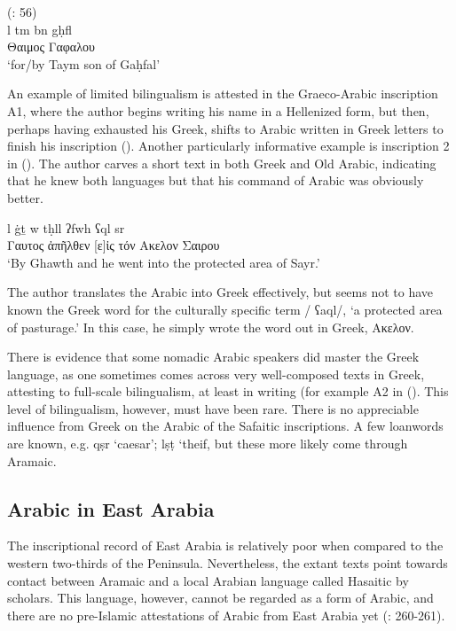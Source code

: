 \documentclass[output=paper]{langsci/langscibook}
\begin{document}
\ea (\citet{Al-Jallad & Al-Manaser 2016}: 56) \\
\gll   l tm bn gḥfl \\
      Θαιμος Γαφαλου \\
\glt   `for/by Taym son of Gaḥfal'\\
\z

An example of limited bilingualism is attested in the Graeco-Arabic inscription A1, where the author begins writing his name in a Hellenized form, but then, perhaps having exhausted his Greek, shifts to Arabic written in Greek letters to finish his inscription (\citet{Al-Jallad & Al-Manaser 2015}). Another particularly informative example is inscription 2 in (\citet{Al-Jallad & Al-Manaser 2016}). The author carves a short text in both Greek and Old Arabic, indicating that he knew both languages but that his command of Arabic was obviously better.

\ea  
\gll   l ġṯ w tḥll ʔfwh ʕql sr \\
      Γαυτος ἀπῆλθεν [ε]ἰς τόν Ακελον Σαιρου \\
\glt   `By Ghawth and he went into the protected area of Sayr.'\\
\z

The author translates the Arabic into Greek effectively, but seems not to have known the Greek word for the culturally specific term / ʕaql/, ‘a protected area of pasturage.’ In this case, he simply wrote the word out in Greek, Ακελον.

There is evidence that some nomadic Arabic speakers did master the Greek language, as one sometimes comes across very well-composed texts in Greek, attesting to full-scale bilingualism, at least in writing (for example A2 in (\citet{Al-Jallad & Al-Manaser 2015}). This level of bilingualism, however, must have been rare. There is no appreciable influence from Greek on the Arabic of the Safaitic inscriptions. A few loanwords are known, e.g. qṣr ‘caesar’; lṣṭ ‘theif, but these more likely come through Aramaic.

\subsection{Arabic in East Arabia}
The inscriptional record of East Arabia is relatively poor when compared to the western two-thirds of the Peninsula. Nevertheless, the extant texts point towards contact between Aramaic and a local Arabian language called Hasaitic by scholars. This language, however, cannot be regarded as a form of Arabic, and there are no pre-Islamic attestations of Arabic from East Arabia yet (\citet{Al-Jallad2018ANA}: 260-261). 
\end{document}
